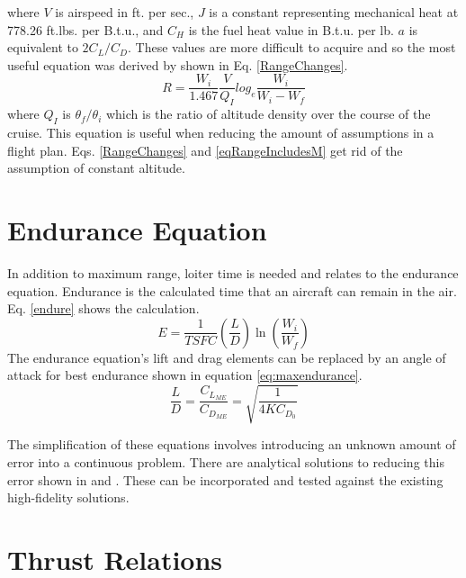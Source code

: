where $V$ is airspeed in ft. per sec., $J$ is a constant representing mechanical heat at 778.26 ft.lbs. per B.t.u., and $C_H$ is the fuel heat value in B.t.u. per lb. $a$ is equivalent to $2C_L/C_D$. These values are more difficult to acquire and so the most useful equation was derived by \cite{Jonas1947} shown in Eq. \ref{RangeChanges}.
\begin{equation}
    R = \dfrac{W_i}{1.467}\dfrac{V}{Q_I}log_e\dfrac{W_i}{W_i-W_f}
    \label{RangeChanges}
\end{equation}
where $Q_I$ is $\theta_f/\theta_i$ which is the ratio of altitude density over the course of the cruise. This equation is useful when reducing the amount of assumptions in a flight plan. Eqs. \ref{RangeChanges} and \ref{eqRangeIncludesM} get rid of the assumption of constant altitude.\par
\section{Endurance Equation}
In addition to maximum range, loiter time is needed and relates to the endurance equation. Endurance is the calculated time that an aircraft can remain in the air. Eq. \ref{endure} shows the calculation.
\begin{equation}
\label{endure}
E = \dfrac{1}{TSFC}\left(\dfrac{L}{D}\right) \ln\left(\dfrac{W_i}{W_f}\right)
\end{equation}
The endurance equation's lift and drag elements can be replaced by an angle of attack for best endurance \cite{OptimizeBreguet} shown in equation \ref{eq:maxendurance}.
\begin{equation}
\label{eq:maxendurance}
\dfrac{L}{D} = \dfrac{C_{L_{ME}}}{C_{D_{ME}}} = \sqrt{\dfrac{1}{4KC_{D_0}}}
\end{equation}
\par 
The simplification of these equations involves introducing an unknown amount of error into a continuous problem. There are analytical solutions to reducing this error shown in \cite{OptimizeBreguet} and \cite{LoiterTimeFromRange}. These can be incorporated and tested against the existing high-fidelity solutions.\par

\section{Thrust Relations}

